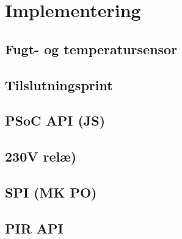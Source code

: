 \chapter{Implementering}


\section{Fugt- og temperatursensor}


\section{Tilslutningsprint}


\section{PSoC API (JS)}


\section{230V relæ)}


\newpage
\section{SPI (MK PO)}


\section{PIR API}




